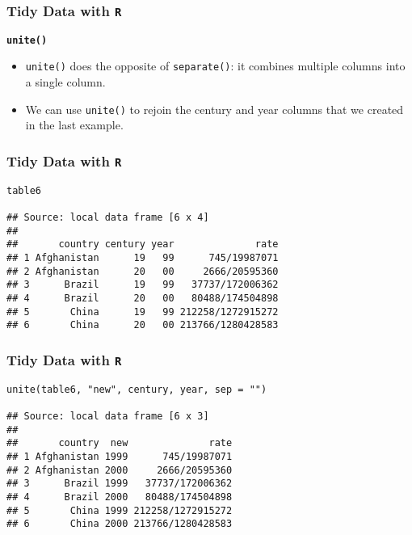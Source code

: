 \documentclass[TIDYMASTER.tex]{subfiles}
\begin{document}
 
	
\begin{frame}[fragile]
\frametitle{Tidy Data with \texttt{R}}
\Large
\vspace{-1cm}
\noindent \textbf{\texttt{unite()}}
\begin{itemize}
\item 
\texttt{unite()} does the opposite of \texttt{separate()}: it combines multiple columns into a single column.


\item We can use \texttt{unite()} to rejoin the century and year columns that we created in the last example. 
\end{itemize}


\end{frame}
\begin{frame}[fragile]
\frametitle{Tidy Data with \texttt{R}}
\large
\begin{framed}
\begin{verbatim}
table6

## Source: local data frame [6 x 4]
## 
##       country century year              rate
## 1 Afghanistan      19   99      745/19987071
## 2 Afghanistan      20   00     2666/20595360
## 3      Brazil      19   99   37737/172006362
## 4      Brazil      20   00   80488/174504898
## 5       China      19   99 212258/1272915272
## 6       China      20   00 213766/1280428583
\end{verbatim}
\end{framed}

\end{frame}
\begin{frame}[fragile]
\frametitle{Tidy Data with \texttt{R}}{\large
\begin{framed}
\begin{verbatim}
unite(table6, "new", century, year, sep = "")

## Source: local data frame [6 x 3]
## 
##       country  new              rate
## 1 Afghanistan 1999      745/19987071
## 2 Afghanistan 2000     2666/20595360
## 3      Brazil 1999   37737/172006362
## 4      Brazil 2000   80488/174504898
## 5       China 1999 212258/1272915272
## 6       China 2000 213766/1280428583
\end{verbatim}
\end{framed}
}

\end{frame}
\end{document}
